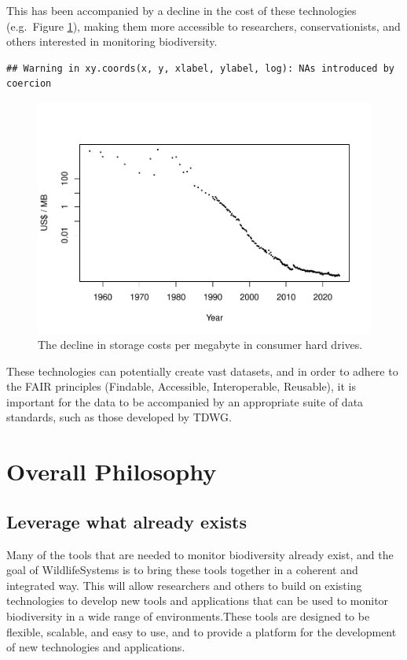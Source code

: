 \documentclass[
]{book}
\begin{document}
This has been accompanied by a decline in the cost of these technologies (e.g.~Figure \ref{fig:storage-costs}), making them more accessible to researchers, conservationists, and others interested in monitoring biodiversity.

\begin{verbatim}
## Warning in xy.coords(x, y, xlabel, ylabel, log): NAs introduced by coercion
\end{verbatim}

\begin{figure}
\centering
\includegraphics{_main_files/figure-latex/storage-costs-1.pdf}
\caption{\label{fig:storage-costs}The decline in storage costs per megabyte in consumer hard drives.}
\end{figure}

These technologies can potentially create vast datasets, and in order to adhere to the FAIR principles (Findable, Accessible, Interoperable, Reusable), it is important for the data to be accompanied by an appropriate suite of data standards, such as those developed by TDWG.

\section{Overall Philosophy}\label{overall-philosophy}

\subsection{Leverage what already exists}\label{leverage-what-already-exists}

Many of the tools that are needed to monitor biodiversity already exist, and the goal of WildlifeSystems is to bring these tools together in a coherent and integrated way. This will allow researchers and others to build on existing technologies to develop new tools and applications that can be used to monitor biodiversity in a wide range of environments.These tools are designed to be flexible, scalable, and easy to use, and to provide a platform for the development of new technologies and applications.
\end{document}
